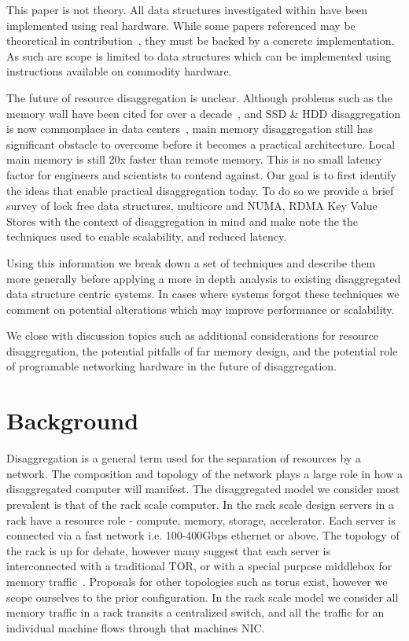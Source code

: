 This paper is not theory. All data structures investigated within have been
implemented using real hardware. While some papers referenced may be theoretical
in contribution~\cite{flat-combine,hopscotch,linked-list-cas}, they must be
backed by a concrete implementation. As such are scope is limited to data
structures which can be implemented using instructions available on commodity
hardware.


The future of resource disaggregation is unclear. Although problems such as the
memory wall have been cited for over a decade~\cite{blade-server}, and SSD \&
HDD disaggregation is now commonplace in data centers~\cite{decible}, main
memory disaggregation still has significant obstacle to overcome before it
becomes a practical architecture.  Local main memory is still 20x faster than
remote memory. This is no small latency factor for engineers and scientists to
contend against. Our goal is to first identify the ideas that enable practical
disaggregation today. To do so we provide a brief survey of lock free data
structures, multicore and NUMA, RDMA Key Value Stores with the context of
disaggregation in mind and make note the the techniques used to enable
scalability, and reduced latency.

Using this information we break down a set of techniques and describe them more
generally before applying a more in depth analysis to existing disaggregated
data structure centric systems. In cases where systems forgot these techniques
we comment on potential alterations which may improve performance or
scalability.

We close with discussion topics such as additional considerations for resource
disaggregation, the potential pitfalls of far memory design, and the potential
role of programable networking hardware in the future of disaggregation.


\section{Background}

Disaggregation is a general term used for the separation
of resources by a network. The composition and topology of the network plays a
large role in how a disaggregated computer will manifest. The disaggregated
model we consider most prevalent is that of the rack scale computer. In the rack
scale design servers in a rack have a resource role - compute, memory, storage,
accelerator. Each server is connected via a fast network i.e. 100-400Gbps
ethernet or above. The topology of the rack is up for debate, however many
suggest that each server is interconnected with a traditional TOR, or with a
special purpose middlebox for memory traffic~\cite{disandapp}. Proposals for
other topologies such as torus exist, however we scope ourselves to the prior
configuration. In the rack scale model we consider all memory traffic in a rack
transits a centralized switch, and all the traffic for an individual machine
flows through that machines NIC.


